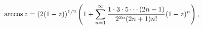 \[\mathop{\mathrm{arccos}\/}\nolimits z=(2(1-z))^{1/2}\*\left(1+\sum_{n=1}^{%
\infty}\frac{1\cdot 3\cdot 5\cdots(2n-1)}{2^{2n}(2n+1)n!}(1-z)^{n}\right),\]